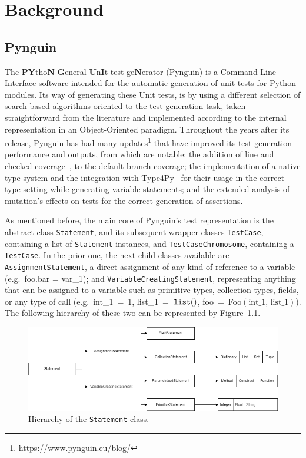 \documentclass[%
  chapterprefix=false,%
  open=right,%
  twoside=true,%
  paper=a4,%
  logofile={Figures/logo.png},%
  thesistype=master,%
  UKenglish,%
]{se2thesis}
\newcommand{\classname}[1]{\texttt{#1}}
\newcommand{\callable}[2][]{\(\text{\texttt{#2}}(#1)\)}
\begin{document}
\chapter{Background}\label{chap:background}

\section{Pynguin}

The \textbf{PY}tho\textbf{N} \textbf{G}eneral \textbf{U}n\textbf{I}t test ge\textbf{N}erator (Pynguin) is a Command Line Interface software intended for the automatic generation of unit tests for Python modules.
Its way of generating these Unit tests, is by using a different selection of search-based algorithms oriented to the test generation task, taken straightforward from the literature and implemented according to the internal representation in an Object-Oriented paradigm.
Throughout the years after its release, Pynguin has had many updates\footnote{https://www.pynguin.eu/blog/} that have improved its test generation performance and outputs, from which are notable: the addition of line and checked coverage~\cite{DBLP:conf/icst/SchulerZ11}, to the default branch coverage; the implementation of a native type system and the integration with Type4Py~\cite{DBLP:conf/icse/MirLPG22} for their usage in the correct type setting while generating variable statements; and the extended analysis of mutation's effects on tests for the correct generation of assertions.

As mentioned before, the main core of Pynguin's test representation is the abstract class \classname{Statement}, and its subsequent wrapper classes \classname{TestCase}, containing a list of \classname{Statement} instances, and \classname{TestCaseChromosome}, containing a \classname{TestCase}.
In the prior one, the next child classes available are \classname{AssignmentStatement}, a direct assignment of any kind of reference to a variable (e.g.~foo.bar = var\_1); and \classname{VariableCreatingStatement}, representing anything that can be assigned to a variable such as primitive types, collection types, fields, or any type of call (e.g.~int\_1~=~1, list\_1~=~\callable{list}, foo~=~Foo\((\text{int\_1,~list\_1})\)).
The following hierarchy of these two can be represented by Figure~\ref{fig:hierarchy}.

\begin{figure}[h]\label{fig:hierarchy}
  \centering
  \includegraphics[width=1\textwidth]{Figures/statement_hierarchy2.png}
  \vspace*{0.5cm}
  \caption{Hierarchy of the \classname{Statement} class.}
\end{figure}
\end{document}
